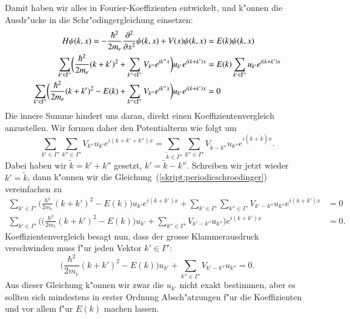 Damit haben wir alles in Fourier-Koeffizienten entwickelt, und k"onnen die
Ausdr"ucke in die Schr"odingergleichung einsetzen:
\begin{align}
H\psi(k,x)
=
-\frac{\hbar^2}{2m_e}\frac{\partial^2}{\partial x^2} \psi(k,x)
+V(x)\psi(k,x)
&=E(k)\psi(k,x)
\notag
\\
\sum_{k'\in\Gamma'}\biggl(
\frac{\hbar^2}{2m_e}(k+k')^2
+
\sum_{k''\in\Gamma'}V_{k''}e^{ik''x}
\biggr)u_{k'}e^{i(k+k')x}
&=
E(k)\sum_{k'\in\Gamma'} u_{k'}e^{i(k+k')x}
\notag
\\
\sum_{k'\in\Gamma'}\biggl(
\frac{\hbar^2}{2m_e}(k+k')^2
-E(k)
+
\sum_{k''\in\Gamma'}V_{k''}e^{ik''x}
\biggr)u_{k'}e^{i(k+k')x}
&=
0
\label{skript:periodicschroedinger}
\end{align}
Die innere Summe hindert uns daran, direkt einen Koeffizientenvergleich
anzustellen.
Wir formen daher den Potentialterm wie folgt um
\begin{equation*}
\sum_{k'\in\Gamma'}
\sum_{k''\in\Gamma'}V_{k''}u_{k'}e^{i(k+k'+k'')x}
=
\sum_{\tilde k\in\Gamma'}
\sum_{k''\in\Gamma'}V_{\tilde k-k''}u_{k''}e^{i(k+\tilde k)x}.
\end{equation*}
Dabei haben wir $\tilde k=k'+k''$ gesetzt, $k'=\tilde k-k''$.
Schreiben wir jetzt wieder $k'=\tilde k$, dann k"onnen wir die
Gleichung~(\ref{skript:periodicschroedinger}) vereinfachen zu
\begin{align*}
\sum_{k'\in\Gamma'}\biggl(
\frac{\hbar^2}{2m_e}(k+k')^2
-E(k)
\biggr)u_{k'}e^{i(k+k')x}
+
\sum_{k'\in\Gamma'}\sum_{k''\in\Gamma'}V_{k'-k''}u_{k''}e^{i(k+k')x}
&=
0
\\
\sum_{k'\in\Gamma'}\biggl(
\biggl(
\frac{\hbar^2}{2m_e}(k+k')^2
-E(k)
\biggr)u_{k'}
+
\sum_{k''\in\Gamma'}V_{k'-k''}u_{k''}
\biggl)
e^{i(k+k')x}
&=
0.
\end{align*}
Koeffizientenvergleich besagt nun, dass der grosse Klammerausdruck
verschwinden muss f"ur jeden Vektor $k'\in\Gamma'$:
\begin{equation}
\biggl(
\frac{\hbar^2}{2m_e}(k+k')^2
-E(k)
\biggr)u_{k'}
+
\sum_{k''\in\Gamma'}V_{k'-k''}u_{k''}
=
0.
\label{skript:ukgleichung}
\end{equation}
Aus dieser Gleichung k"onnen wir zwar die $u_{k'}$ nicht exakt
bestimmen, aber es sollten sich mindestens in erster Ordnung
Absch"atzungen f"ur die Koeffizienten und vor allem f"ur $E(k)$
machen lassen.

